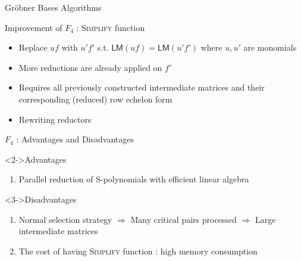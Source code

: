\documentclass{beamer}
\newcommand{\Field}{\mathbb{F}}
\newcommand{\LM}[1]{\mathsf{LM}(#1)}
\newcommand{\Tail}[1]{\mathsf{Tail}(#1)}
\newcommand{\Mono}[1]{\mathsf{Mono}(#1)}
\newcommand{\mpolyring}[3]{#1[#2_{1}, \ldots, #2_{#3}]}
\newcommand{\Grobner}{Gr\"{o}bner }
\begin{document}
\begin{section}{\Grobner Bases Algorithms}
\begin{frame}{Improvement of $F_4$ : \textsc{Simplify} function}
  \begin{itemize}
    
  \item<2-> Replace $uf$ with $u'f'$ s.t. $\LM{uf} = \LM{u'f'}$ where
    $u, u'$ are monomials
  \item<3-> More reductions are already applied on $f'$
  \item<4-> Requires all previously constructed intermediate matrices
    and their corresponding (reduced) row echelon form
  \item<5-> Rewriting reductors
  \end{itemize}
\end{frame}

\begin{frame}{$F_4$ : Advantages and Disadvantages}
  \begin{block}<2->{Advantages}
    \begin{enumerate}
    \item Parallel reduction of S-polynomials with efficient linear
      algebra
    \end{enumerate}
  \end{block}

  \begin{block}<3->{Disadvantages}
    \begin{enumerate}
    \item Normal selection strategy $\Rightarrow$ Many critical pairs
      processed $\Rightarrow$ Large intermediate matrices
    \item The cost of having \textsc{Simplify} function : high memory
      consumption

    \end{enumerate}
  \end{block}
  
\end{frame}



    

\end{section}
\end{document}
